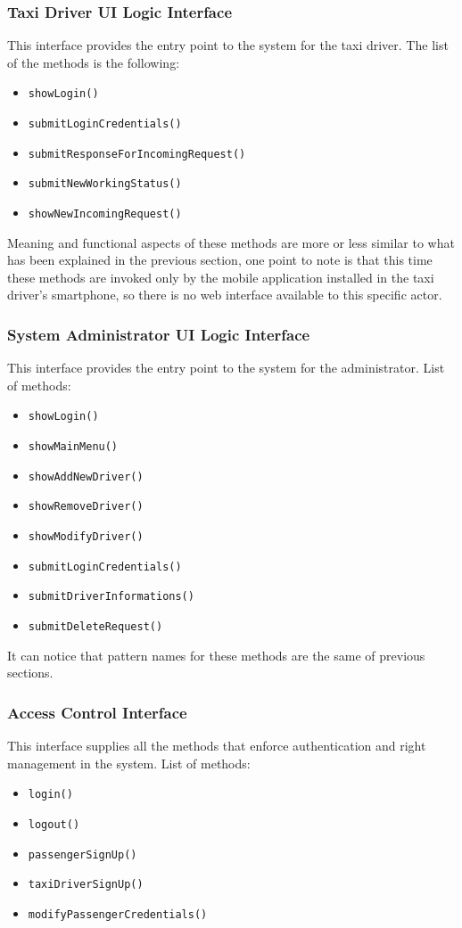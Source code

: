 \subsubsection{Taxi Driver UI Logic Interface}
This interface provides the entry point to the system for the taxi driver.
The list of the methods is the following:
\begin{itemize}
	\item \texttt{showLogin()}
	\item \texttt{submitLoginCredentials()}
	\item \texttt{submitResponseForIncomingRequest()}
	\item \texttt{submitNewWorkingStatus()}
	\item \texttt{showNewIncomingRequest()}
\end{itemize}
Meaning and functional aspects of these methods are more or less similar to what has been explained in the previous section, one point to note is that this time these methods are invoked only by the mobile application installed in the taxi driver's smartphone, so there is no web interface available to this specific actor.
\subsubsection{System Administrator UI Logic Interface}
This interface provides the entry point to the system for the administrator. \newline
List of methods:
\begin{itemize}
	\item \texttt{showLogin()}
	\item \texttt{showMainMenu()}
	\item \texttt{showAddNewDriver()}
	\item \texttt{showRemoveDriver()}
	\item \texttt{showModifyDriver()}
	\item \texttt{submitLoginCredentials()}
	\item \texttt{submitDriverInformations()}
	\item \texttt{submitDeleteRequest()}
\end{itemize}
It can notice that pattern names for these methods are the same of previous sections.
\subsubsection{Access Control Interface}
This interface supplies all the methods that enforce authentication and right management in the system. \newline
List of methods:
\begin{itemize}
	\item \texttt{login()}
	\item \texttt{logout()}
	\item \texttt{passengerSignUp()}
	\item \texttt{taxiDriverSignUp()}
	\item \texttt{modifyPassengerCredentials()}
\end{itemize}
